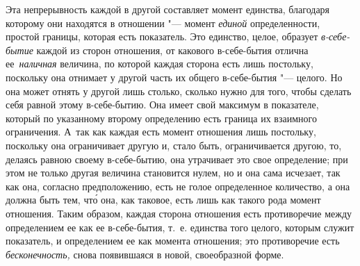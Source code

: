 Эта непрерывность каждой в другой составляет момент единства, благодаря
которому они находятся в отношении "--- момент {\em единой} определенности,
простой границы, которая есть показатель. Это единство, целое, образует
{\em в-себе-бытие} каждой из сторон отношения, от какового в-себе-бытия отлична
ее~{\em наличная} величина, по которой каждая сторона есть лишь постольку,
поскольку она отнимает у другой часть их общего в-себе-бытия "--- целого. Но
она может отнять у другой лишь столько, сколько нужно для того, чтобы сделать
себя равной этому в-себе-бытию. Она имеет свой максимум в показателе, который
по указанному второму определению есть граница их взаимного ограничения. А~так
как каждая есть момент отношения лишь постольку, поскольку она ограничивает
другую и, стало быть, ограничивается другою, то, делаясь равною своему
в-себе-бытию, она утрачивает это свое определение; при этом не только другая
величина становится нулем, но и она сама
исчезает, так как она, согласно предположению, есть не голое определенное
количество, а она должна быть тем, чт\'{о} она, как таковое, есть лишь как
такого рода момент отношения. Таким образом, каждая сторона отношения есть
противоречие между определением ее как ее в-себе-бытия, т.~е. единства того
целого, которым служит показатель, и определением ее как момента отношения; это
противоречие есть {\em бесконечность,} снова появившаяся в новой, своеобразной
форме.

